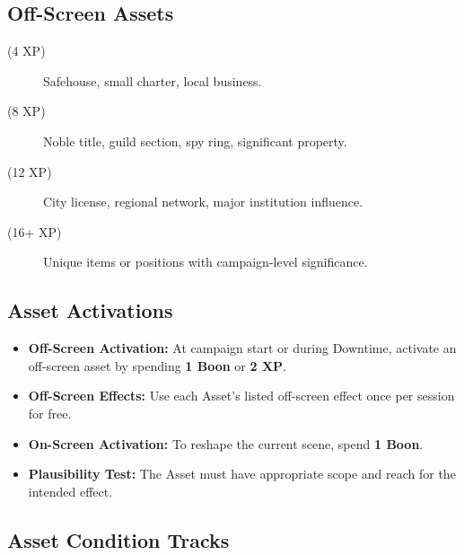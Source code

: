 \subsection{Off-Screen Assets}
\label{subsec:off-screen-assets}

\begin{description}
\item[ (4 XP)] Safehouse, small charter, local business. 
\item[ (8 XP)] Noble title, guild section, spy ring, significant property. 
\item[ (12 XP)] City license, regional network, major institution influence. 
\item[ (16+ XP)] Unique items or positions with campaign-level significance. 
\end{description}

\subsection{Asset Activations}
\label{subsec:asset-activations}

\begin{itemize}
    \item \textbf{Off-Screen Activation:} At campaign start or during Downtime, activate an off-screen asset by spending \textbf{1 Boon} or \textbf{2 XP}. 
    \item \textbf{Off-Screen Effects:} Use each Asset's listed off-screen effect once per session for free. 
    \item \textbf{On-Screen Activation:} To reshape the current scene, spend \textbf{1 Boon}. 
    \item \textbf{Plausibility Test:} The Asset must have appropriate scope and reach for the intended effect. 
\end{itemize}

\subsection{Asset Condition Tracks}
\label{subsec:asset-conditions}

